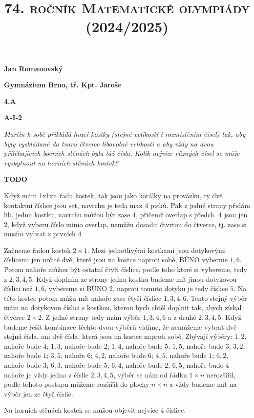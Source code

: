 \documentclass{article}
\title{\normalsize{\vspace{-2cm}\textsc{74. ročník Matematické olympiády (2024/2025)}\vspace{-1.7cm}}}
\date{}
\author{}
\begin{document}
\maketitle

\textbf{ }

\noindent \textbf{Jan Romanovský}

\noindent \textbf{Gymnázium Brno, tř. Kpt. Jaroše}

\noindent \textbf{4.A}

\noindent \textbf{A-\textrm{I}-2}

\textbf{ }

\textit{Martin k sobě přikládá hrací kostky (stejné velikostí i rozmístěním čísel) tak, aby byly vyskládané do tvaru čtverce libovolné velikosti a aby vždy na dvou přiléhajících bočních stěnách byla táž čísla. Kolik nejvíce různých čísel se může vyskytnout na horních stěnách kostek?}

\textbf{TODO }

Když mám 1x1xn řadu kostek, tak jsou jako korálky na provázku, ty dvě kontaktní číslice jsou set, navrchu je teda max 4 picků. Pak z jedné strany přidám lib. jednu kostku, navrchu můžou být zase 4, přičemž overlap s předch. 4 jsou jen 2, když vyberu číslo mimo overlap, nemůžu dosadit čtvrtou do čtverce, tj. zase si musím vybrat z prvních 4

Začneme řadou kostek $2 \times 1$. Mezi jednotlivými kostkami jsou dotykovými číslicemi jen určité dvě, které jsou na kostce naproti sobě, BÚNO vyberme $1, 6$. Potom nahoře můžou být ostatní čtyři číslice, podle toho které si vybereme, tedy z $2, 3, 4, 5$. Když doplním ze strany jednu kostku budeme mít jinou dotykovou číslici než $1, 6$, vybereme si BÚNO $2$, naproti tomuto dotyku je tedy číslice $5$. Na této kostce potom můžu mít nahoře zase čtyři číslice $1, 3, 4, 6$. Tento stejný výběr mám na dotykovou číslici s kostkou, kterou bych chtěl doplnit tak, abych získal čtverec $2 \times 2$. Z jedné strany tedy mám výběr $1,3,4,6$ a z druhé $2,3,4,5$. Když budeme řešit kombinace těchto dvou výběrů vidíme, že nemůžeme vybrat dvě stejná čísla, ani dvě čísla, která jsou na kostce naproti sobě. Zbývají výběry: $1,2$, nahoře bude $4$; $1,3$, nahoře bude $2$; $1,4$, nahoře bude $5$; $1,5$, nahoře bude $3$; $3,2$, nahoře bude $1$; $3,5$, nahoře $6$; $4,2$, nahoře bude $6$; $4 ,5$, nahoře bude $1$; $6,2$, nahoře bude $3$; $6,3$, nahoře bude $5$; $6,4$, nahoře bude $2$; $6,5$, nahoře bude $4$ -- nahoře je vždy jedna z číslic $2, 3, 4, 5$, výběr se nám od řádku $1 \times n$ nerozšířil, podle tohoto postupu můžeme rozšířit do plochy $n \times n$ a vždy budeme mít na výběr jen ze čtyř číslic.

Na horních stěnách kostek se můžou objevit nejvíce $4$ číslice.
\end{document}
